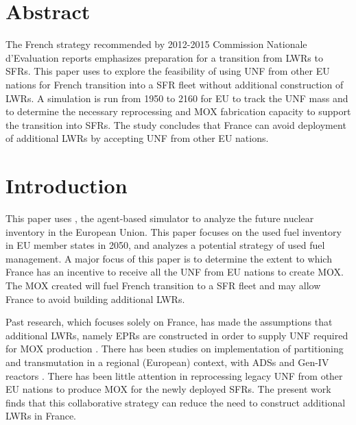 \section{Abstract}
The French strategy recommended by 2012-2015 Commission Nationale d'Evaluation reports
\cite{noauthor_cne2_nodate} emphasizes preparation for a transition from \glspl{LWR} to \glspl{SFR}.
This paper uses \Cyclus to explore the feasibility of using \gls{UNF} from other EU nations
for French transition into a \gls{SFR} fleet without additional construction of \glspl{LWR}.
A \Cyclus simulation is run from 1950 to 2160 for EU to track the \gls{UNF} mass
and to determine the necessary reprocessing and \gls{MOX} fabrication capacity to support
the transition into \glspl{SFR}. The study concludes that France can avoid deployment
of additional \glspl{LWR} by accepting \gls{UNF} from other EU nations.



\section{Introduction}
This paper uses \Cyclus, the agent-based simulator \cite{huff_fundamental_2016} to analyze
the future nuclear inventory in the European Union. This paper focuses on the used fuel
inventory in \gls{EU} member states in 2050, and analyzes a potential strategy of used fuel
management.
A major focus of this paper is to determine the extent to which France has an incentive
to receive all the \gls{UNF} from \gls{EU} nations to create \gls{MOX}.
The \gls{MOX} created will fuel French transition to a \gls{SFR} fleet
and may allow France to avoid building additional \glspl{LWR}.

Past research, which focuses solely on France, has made the assumptions that additional \glspl{LWR},
namely \glspl{EPR} are constructed in order to supply \gls{UNF} required
for \gls{MOX} production \cite{carre_overview_2009, martin_symbiotic_2017, freynet_multiobjective_2016}.
There has been studies on implementation of partitioning and transmutation
in a regional (European) context, with \glspl{ADS} and Gen-IV reactors \cite{fazio_study_2013}.
There has been little attention in reprocessing legacy \gls{UNF} from other
EU nations to produce \gls{MOX} for the newly deployed \glspl{SFR}.
The present work finds that this collaborative strategy can reduce the
need to construct additional \glspl{LWR} in France.


